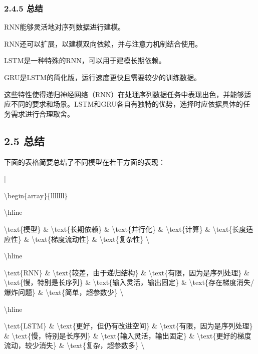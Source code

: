 \subsubsection{\texorpdfstring{\textbf{2.4.5
总结}}{2.4.5 总结}}\label{245-ux603bux7ed3}

RNN能够灵活地对序列数据进行建模。

RNN还可以扩展，以建模双向依赖，并与注意力机制结合使用。

LSTM是一种特殊的RNN，可以用于建模长期依赖。

GRU是LSTM的简化版，运行速度更快且需要较少的训练数据。

这些特性使得递归神经网络（RNN）在处理序列数据任务中表现出色，并能够适应不同的要求和场景。LSTM和GRU各自有独特的优势，选择时应依据具体的任务需求进行合理取舍。

\subsection{\texorpdfstring{\textbf{2.5
总结}}{2.5 总结}}\label{25-ux603bux7ed3}

下面的表格简要总结了不同模型在若干方面的表现：


{[}

\textbackslash begin\{array\}\{\textbar l\textbar l\textbar l\textbar l\textbar l\textbar l\textbar l\textbar\}

\textbackslash hline

\textbackslash text\{模型\} \& \textbackslash text\{长期依赖\} \&
\textbackslash text\{并行化\} \& \textbackslash text\{计算\} \&
\textbackslash text\{长度适应性\} \& \textbackslash text\{梯度流动性\}
\& \textbackslash text\{复杂性\} \textbackslash{}

\textbackslash hline

\textbackslash text\{RNN\} \& \textbackslash text\{较差，由于递归结构\}
\& \textbackslash text\{有限，因为是序列处理\} \&
\textbackslash text\{慢，特别是长序列\} \&
\textbackslash text\{输入灵活，输出固定\} \&
\textbackslash text\{存在梯度消失/爆炸问题\} \&
\textbackslash text\{简单，超参数少\} \textbackslash{}

\textbackslash hline

\textbackslash text\{LSTM\} \&
\textbackslash text\{更好，但仍有改进空间\} \&
\textbackslash text\{有限，因为是序列处理\} \&
\textbackslash text\{慢，特别是长序列\} \&
\textbackslash text\{输入灵活，输出固定\} \&
\textbackslash text\{更好的梯度流动，较少消失\} \&
\textbackslash text\{复杂，超参数多\} \textbackslash{}

